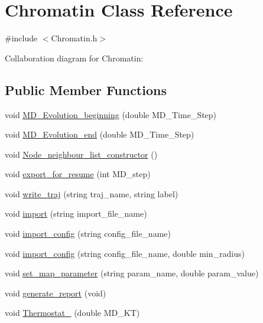 \hypertarget{classChromatin}{}\section{Chromatin Class Reference}
\label{classChromatin}


{\ttfamily \#include $<$Chromatin.\+h$>$}



Collaboration diagram for Chromatin\+:
\subsection*{Public Member Functions}
\begin{DoxyCompactItemize}
\item 
void \mbox{\hyperlink{classChromatin_a7b7d1c6dd9bbd70c9efe5cfd180dc008}{M\+D\+\_\+\+Evolution\+\_\+beginning}} (double M\+D\+\_\+\+Time\+\_\+\+Step)
\item 
void \mbox{\hyperlink{classChromatin_aeb3e8a20562ba32ee888079d1c65c4c2}{M\+D\+\_\+\+Evolution\+\_\+end}} (double M\+D\+\_\+\+Time\+\_\+\+Step)
\item 
void \mbox{\hyperlink{classChromatin_ae8481ef6ce172d5e2ae50b252d234cc9}{Node\+\_\+neighbour\+\_\+list\+\_\+constructor}} ()
\item 
void \mbox{\hyperlink{classChromatin_ab220d2c995636e6c2a50e5bacf6a7105}{export\+\_\+for\+\_\+resume}} (int M\+D\+\_\+step)
\item 
void \mbox{\hyperlink{classChromatin_a9361803ebebca1defa80fe0cfa19bd5e}{write\+\_\+traj}} (string traj\+\_\+name, string label)
\item 
void \mbox{\hyperlink{classChromatin_a398e59a7a3ce36b0cb74dae0cfbba295}{import}} (string import\+\_\+file\+\_\+name)
\item 
void \mbox{\hyperlink{classChromatin_a6e4c5827ebb4cd31cac05c05f5999ded}{import\+\_\+config}} (string config\+\_\+file\+\_\+name)
\item 
void \mbox{\hyperlink{classChromatin_abb34912c862c4377fce32172d481075b}{import\+\_\+config}} (string config\+\_\+file\+\_\+name, double min\+\_\+radius)
\item 
void \mbox{\hyperlink{classChromatin_a6c1fdee78f6bc75784b8d11a5073e7dc}{set\+\_\+map\+\_\+parameter}} (string param\+\_\+name, double param\+\_\+value)
\item 
void \mbox{\hyperlink{classChromatin_a0c988a3b80895ed2c070625646d8ccd3}{generate\+\_\+report}} (void)
\item 
void \mbox{\hyperlink{classChromatin_a0b9c6938baef5531ed325bc431e5636f}{Thermostat\+\_}} (double M\+D\+\_\+\+KT)

\end{DoxyCompactItemize}
